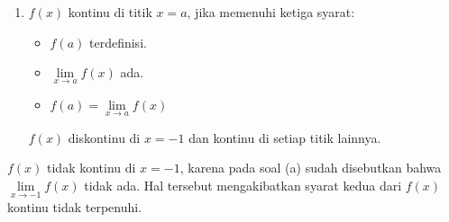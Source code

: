 \documentclass[10pt,openany,a4paper]{article}
\begin{document}
\begin{enumerate}
\begin{enumerate}
            \item $f(x)$ kontinu di titik $x=a$, jika memenuhi ketiga syarat:
            \begin{itemize}
                \item $f(a)$ terdefinisi.
                \item $\lim\limits_{x\to a}f(x)$ ada.
                \item $f(a)=\lim\limits_{x\to a}f(x)$
            \end{itemize}
            $f(x)$ diskontinu di $x=-1$ dan kontinu di setiap titik lainnya.
        \end{enumerate}
        $f(x)$ tidak kontinu di $x=-1$, karena pada soal (a) sudah disebutkan bahwa $\lim\limits_{x\to-1}f(x)$ tidak ada. Hal tersebut mengakibatkan syarat kedua dari $f(x)$ kontinu tidak terpenuhi.\\~\\
        

\end{enumerate}
\end{document}
